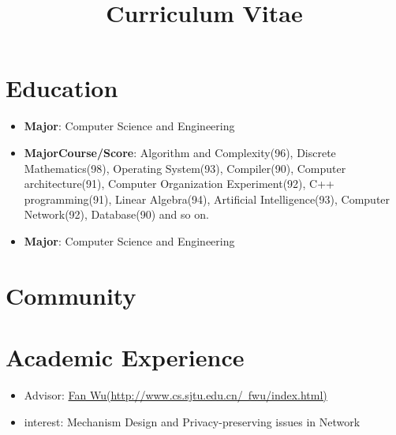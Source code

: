 \documentclass[11pt,a4paper]{moderncv}
\title{Curriculum Vitae}
\begin{document}
\maketitle

\section{Education}
{
\begin{itemize}
\item \textbf{Major}: Computer Science and Engineering
\item \textbf{MajorCourse/Score}: Algorithm and Complexity(96), Discrete Mathematics(98), Operating System(93), Compiler(90), Computer architecture(91), Computer Organization Experiment(92), C++ programming(91), Linear Algebra(94), Artificial Intelligence(93), Computer Network(92), Database(90) and so on.\\
\end{itemize}
}
{
\begin{itemize}
\item \textbf{Major}: Computer Science and Engineering
\end{itemize}
}





\section{Community}

\section{Academic Experience}
{
\begin{itemize}
\item Advisor: \href{http://www.cs.sjtu.edu.cn/~fwu/index.html}{Fan Wu(http://www.cs.sjtu.edu.cn/~fwu/index.html)}
\item interest: Mechanism Design and Privacy-preserving issues in Network
\end{itemize}
}
\end{document}
